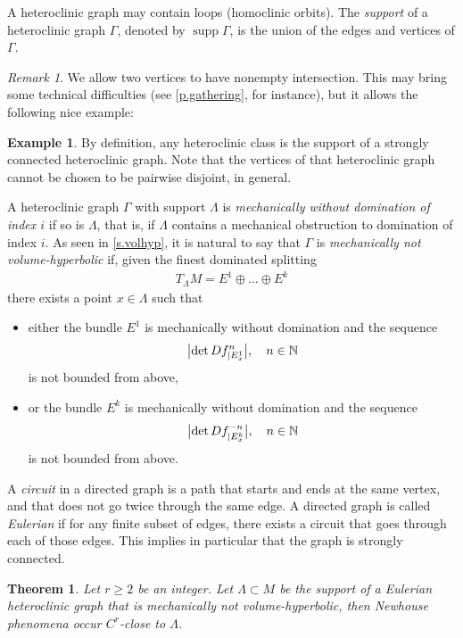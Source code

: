 \documentclass[11pt, a4paper]{amsart}
\theoremstyle{plain}
\newtheorem{theorem}{Theorem} %
\theoremstyle{definition}
\newtheorem{example}{Example}[proposition]
\theoremstyle{remark}
\newtheorem{remark}[proposition]{Remark}
\numberwithin{equation}{section}         %
\DeclareMathOperator*{\supp}{supp}
\begin{document}
A heteroclinic graph may contain loops (homoclinic orbits).
The {\em support} of a heteroclinic graph $\Gamma$, denoted by $\supp \Gamma$, is the union of the edges and vertices of $\Gamma$.

\begin{remark}
We allow two vertices to have nonempty intersection. This may bring some technical difficulties (see \cref{p.gathering}, for instance), but it allows the following nice example:
\end{remark}

\begin{example}
By definition, any heteroclinic class is the support of a strongly connected heteroclinic graph.
Note that the vertices of that heteroclinic graph cannot be chosen to be pairwise disjoint, in general.
\end{example}



A heteroclinic graph $\Gamma$ with support $\Lambda$ is {\em mechanically without domination of index $i$}  if so is 
$\Lambda$, that is, if $\Lambda$ contains a mechanical obstruction to domination of index $i$.
As seen in \cref{s.volhyp}, it is natural to say that $\Gamma$ is {\em mechanically not volume-hyperbolic} if, given the finest dominated splitting 
\begin{align*}T_{\Lambda} M=E^1\oplus ... \oplus E^k\end{align*}
there exists a point $x\in \Lambda$ such that 
\begin{itemize}
\item either the bundle $E^1$ is mechanically without domination and the sequence  
$$\bigl|\det Df^n_{|E^1_x}\bigr|, \quad n\in {\mathbb N}$$
is not bounded from above,
\item or the bundle $E^k$ is mechanically without domination and the sequence 
$$\bigl|\det Df^{-n}_{|E^k_x}\bigr|,  \quad n\in {\mathbb N}$$
is not bounded from above.
\end{itemize}


A {\em circuit} in a directed graph is a path that starts and ends at the same vertex, and that does not go twice through the same edge.
A directed graph is called {\em Eulerian} if for any finite subset of edges, there exists a circuit that goes through each of those edges. This implies in particular that the graph is strongly connected.

\begin{theorem}\label{t.volhyp}
 Let $r\geq 2$ be an integer. Let $\Lambda\subset M$ be the support of a Eulerian heteroclinic graph that is mechanically not volume-hyperbolic, then Newhouse phenomena occur $C^r$-close to $\Lambda$.
\end{theorem}
\end{document}
